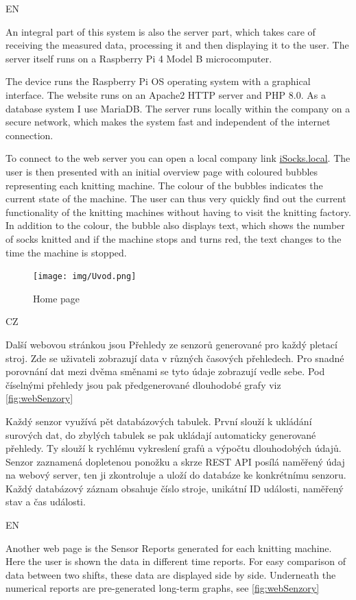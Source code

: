 \documentclass[12pt, a4paper]{article}
\begin{document}
EN

An integral part of this system is also the server part, which takes care of receiving the measured data, processing it and then displaying it to the user.
The server itself runs on a Raspberry Pi 4 Model B microcomputer.

The device runs the Raspberry Pi OS operating system with a graphical interface.
The website runs on an Apache2 HTTP server and PHP 8.0.
As a database system I use MariaDB.
The server runs locally within the company on a secure network, which makes the system fast and independent of the internet connection.

To connect to the web server you can open a local company link \newline\href{http://iSocks.local}{iSocks.local}.
The user is then presented with an initial overview page with coloured bubbles representing each knitting machine.
The colour of the bubbles indicates the current state of the machine. The user can thus very quickly find out the current functionality of the knitting machines without having to visit the knitting factory.
In addition to the colour, the bubble also displays text, which shows the number of socks knitted and if the machine stops and turns red, the text changes to the time the machine is stopped.


\begin{figure}[t]
    \centering
    \texttt{[image: img/Uvod.png]}
    \caption{Home page}
    \label{fig:webUvod}
\end{figure}

CZ

Další webovou stránkou jsou Přehledy ze senzorů generované pro každý pletací stroj.
Zde se uživateli zobrazují data v různých časových přehledech.
Pro snadné porovnání dat mezi dvěma směnami se tyto údaje zobrazují vedle sebe.
Pod číselnými přehledy jsou pak předgenerované dlouhodobé grafy viz \ref{fig:webSenzory}

Každý senzor využívá pět databázových tabulek. První slouží k ukládání surových dat, do zbylých tabulek se pak ukládají automaticky generované přehledy.
Ty slouží k rychlému vykreslení grafů a výpočtu dlouhodobých údajů.
Senzor zaznamená dopletenou ponožku a skrze REST API posílá naměřený údaj na webový server, ten ji zkontroluje a uloží do databáze ke konkrétnímu senzoru.
Každý databázový záznam obsahuje číslo stroje, unikátní ID události, naměřený stav a čas události.

EN

Another web page is the Sensor Reports generated for each knitting machine.
Here the user is shown the data in different time reports.
For easy comparison of data between two shifts, these data are displayed side by side.
Underneath the numerical reports are pre-generated long-term graphs, see \ref{fig:webSenzory}
\end{document}
